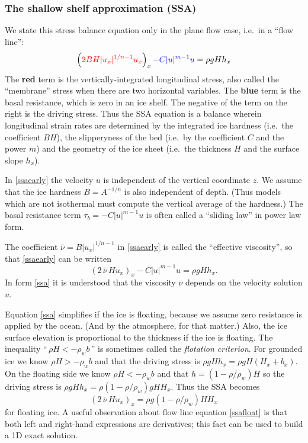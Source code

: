 \documentclass[titlepage,a4paper,final,12pt]{scrartcl}
\begin{document}
\subsubsection*{The shallow shelf approximation (SSA)}  We state this stress balance equation only in the plane flow case, i.e.~in a ``flow line'':
\begin{equation}
  \left({\color{red} 2 B H |u_x|^{1/n - 1} u_x}\right)_x {\color{blue} - C|u|^{m-1}u} = \rho g H h_x \label{ssaearly}
\end{equation}
The {\color{red} \textbf{red}} term is the vertically-integrated longitudinal stress, also called the ``membrane'' stress when there are two horizontal variables.  The {\color{blue} \textbf{blue}} term is the basal resistance, which is zero in an ice shelf.  The negative of the term on the right is the driving stress.  Thus the SSA equation is a balance wherein longitudinal strain rates are determined by the integrated ice hardness (i.e.~the coefficient $BH$), the slipperyness of the bed (i.e.~by the coefficient $C$ and the power $m$) and the geometry of the ice sheet (i.e.~the thickness $H$ and the surface slope $h_x$).

In \eqref{ssaearly} the velocity $u$ is independent of the vertical coordinate $z$.  We assume that the ice hardness $B=A^{-1/n}$ is also independent of depth.  (Thus models which are not isothermal must compute the vertical average of the hardness.)  The basal resistance term $\tau_b = - C|u|^{m-1}u$ is often called a ``sliding law'' in power law form.

The coefficient $\bar \nu = B |u_x|^{1/n-1}$ in \eqref{ssaearly} is called the ``effective viscosity'', so that \eqref{ssaearly} can be written
\begin{equation}
  \left(2 \,\bar \nu\, H u_x\right)_x - C |u|^{m-1} u = \rho g H h_x.  \label{ssa}
\end{equation}
In form \eqref{ssa} it is understood that the viscosity $\bar\nu$ depends on the velocity solution $u$.

Equation \eqref{ssa} simplifies if the ice is floating, because we assume zero resistance is applied by the ocean.  (And by the atmosphere, for that matter.)  Also, the ice surface elevation is proportional to the thickness if the ice is floating.  The inequality ``$\,\rho H < - \rho_w b\,$'' is sometimes called the \emph{flotation criterion}.  For grounded ice we know $\rho H > - \rho_w b$ and that the driving stress is $\rho g H h_x = \rho g H (H_x + b_x)$.  On the floating side we know $\rho H < - \rho_w b$ and that $h = (1-\rho/\rho_w) H$ so the driving stress is $\rho g H h_x = \rho(1-\rho/\rho_w) g H H_x$.  Thus the SSA becomes
\begin{equation}
   \left(2 \,\bar\nu\, H u_x\right)_x = \rho g (1-\rho/\rho_w) H H_x \label{ssafloat}
\end{equation}
for floating ice.  A useful observation about flow line equation \eqref{ssafloat} is that both left and right-hand expressions are derivatives; this fact can be used to build a 1D exact solution.
\end{document}
